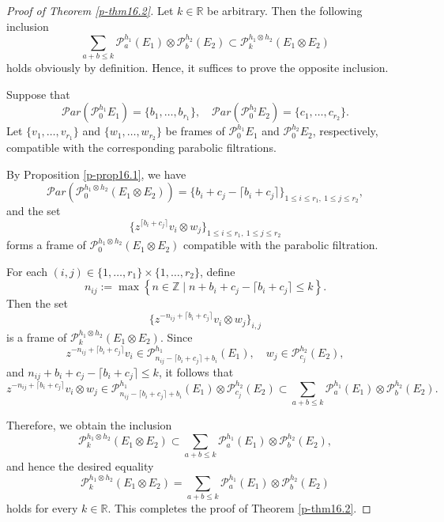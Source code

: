 \documentclass[12pt,twoside]{amsart}
\theoremstyle{definition}
\begin{document}
\begin{proof}[Proof of Theorem \ref{p-thm16.2}]
Let \( k \in \mathbb{R} \) be arbitrary. Then the following inclusion  
\[
\sum_{a + b \leq k} \mathcal{P}^{h_1}_a(E_1) \otimes \mathcal{P}^{h_2}_b(E_2)
\subset \mathcal{P}^{h_1 \otimes h_2}_k(E_1 \otimes E_2)
\]  
holds obviously by definition. Hence, it 
suffices to prove the opposite inclusion.

Suppose that  
\[
\mathcal{P}ar(\mathcal{P}^{h_1}_0 E_1) = \{b_1, \ldots, b_{r_1}\}, \quad 
\mathcal{P}ar(\mathcal{P}^{h_2}_0 E_2) = \{c_1, \ldots, c_{r_2}\}.
\]  
Let \( \{v_1, \ldots, v_{r_1}\} \) and \( \{w_1, \ldots, w_{r_2}\} \) be frames of 
\( \mathcal{P}^{h_1}_0 E_1 \) and \( \mathcal{P}^{h_2}_0 E_2 \), respectively, 
compatible with the corresponding parabolic filtrations.

By Proposition \ref{p-prop16.1}, we have  
\[
\mathcal{P}ar\left( \mathcal{P}^{h_1 \otimes h_2}_0(E_1 \otimes E_2) \right)
= \{ b_i + c_j - \lceil b_i + c_j 
\rceil \}_{1 \leq i \leq r_1,\ 1 \leq j \leq r_2},
\]  
and the set  
\[
\{ z^{\lceil b_i + c_j \rceil} v_i \otimes w_j \}_{1 \leq i \leq r_1,\ 1 \leq j \leq r_2}
\]  
forms a frame of \( \mathcal{P}^{h_1 \otimes h_2}_0(E_1 \otimes E_2) \) 
compatible with the parabolic filtration.

For each \( (i,j) \in \{1, \ldots, r_1\} \times \{1, \ldots, r_2\} \), define  
\[
n_{ij} := \max \left\{ n \in \mathbb{Z} 
\mid n + b_i + c_j - \lceil b_i + c_j \rceil \leq k \right\}.
\]  
Then the set  
\[
\{ z^{-n_{ij} + \lceil b_i + c_j \rceil} v_i \otimes w_j \}_{i,j}
\]  
is a frame of \( \mathcal{P}^{h_1 \otimes h_2}_k(E_1 \otimes E_2) \).  
Since  
\[
z^{-n_{ij} + \lceil b_i + c_j \rceil} v_i \in 
\mathcal{P}^{h_1}_{n_{ij} - \lceil b_i + c_j \rceil + b_i}(E_1), 
\quad w_j \in \mathcal{P}^{h_2}_{c_j}(E_2),
\]  
and \( n_{ij} + b_i + c_j - \lceil b_i + c_j \rceil \leq k \), it follows that  
\[
z^{-n_{ij} + \lceil b_i + c_j \rceil} v_i \otimes w_j \in 
\mathcal{P}^{h_1}_{n_{ij} - \lceil b_i + c_j \rceil + b_i}(E_1) \otimes 
\mathcal{P}^{h_2}_{c_j}(E_2) 
\subset \sum_{a + b \leq k} \mathcal{P}^{h_1}_a(E_1) \otimes \mathcal{P}^{h_2}_b(E_2).
\]

Therefore, we obtain the inclusion  
\[
\mathcal{P}^{h_1 \otimes h_2}_k(E_1 \otimes E_2) 
\subset \sum_{a + b \leq k} \mathcal{P}^{h_1}_a(E_1) \otimes \mathcal{P}^{h_2}_b(E_2),
\]  
and hence the desired equality  
\[
\mathcal{P}^{h_1 \otimes h_2}_k(E_1 \otimes E_2) 
= \sum_{a + b \leq k} \mathcal{P}^{h_1}_a(E_1) \otimes \mathcal{P}^{h_2}_b(E_2)
\]  
holds for every \( k \in \mathbb{R} \). This completes the proof of Theorem \ref{p-thm16.2}.
\end{proof}
\end{document}
